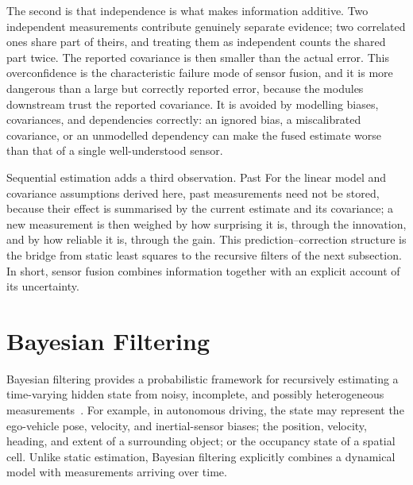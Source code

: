 \documentclass[graybox,envcountchap]{style/SNmono}
\providecommand{\DIFadd}[1]{{\protect\color{blue} #1}} %
\providecommand{\DIFdel}[1]{{\protect\color{red} #1}} %
\providecommand{\DIFaddbegin}{} %
\providecommand{\DIFaddend}{} %
\providecommand{\DIFdelbegin}{} %
\providecommand{\DIFdelend}{} %
\begin{document}
The second is that independence is what makes information additive. Two independent measurements contribute genuinely separate evidence; two correlated ones share part of theirs, and treating them as independent counts the shared part twice. The reported covariance is then smaller than the actual error. This overconfidence is the characteristic failure mode of sensor fusion, and it is more dangerous than a large but correctly reported error, because the modules downstream trust the reported covariance. It is avoided by modelling biases, covariances, and dependencies correctly: an ignored bias, a miscalibrated covariance, or an unmodelled dependency can make the fused estimate worse than that of a single well-understood sensor.

Sequential estimation adds a third observation. \DIFdelbegin \DIFdel{Past }\DIFdelend \DIFaddbegin \DIFadd{For the linear model and covariance assumptions derived here, past }\DIFaddend measurements need not be stored, because their effect is summarised by the current estimate and its covariance; a new measurement is then weighed by how surprising it is, through the innovation, and by how reliable it is, through the gain. This prediction--correction structure is the bridge from static least squares to the recursive filters of the next subsection.
In short, sensor fusion combines information together with an explicit account of its uncertainty.
































\section{Bayesian Filtering}
\label{sec:bayes-filtering}






Bayesian filtering provides a probabilistic framework for recursively estimating a time-varying hidden state from noisy, incomplete, and possibly heterogeneous measurements~\cite{sarkka2013_bayesian}. For example, in autonomous driving, the state may represent the ego-vehicle pose, velocity, and inertial-sensor biases; the position, velocity, heading, and extent of a surrounding object; or the occupancy state of a spatial cell. Unlike static estimation, Bayesian filtering explicitly combines a dynamical model with measurements arriving over time.
\end{document}
